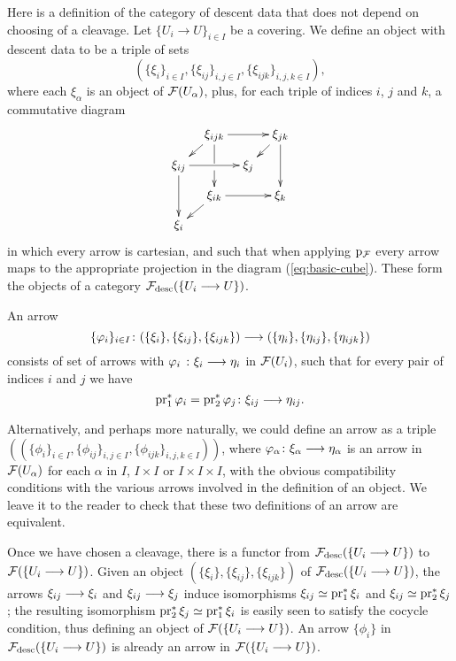 \begin{4   STACKS}
\begin{4.1 Descent of objects of fibcats}
Here is a definition of the category of descent data that does not depend on choosing of a cleavage. Let $\{U_i \to U\}_{i \in I}$ be a covering. We define an object with descent data to be a triple of sets
   \[
   (\{\xi_i\}_{i \in I}, \{\xi_{ij}\}_{i, j\in I},
   \{\xi_{ijk}\}_{i, j, k\in I}),
   \]
where each $\xi_\alpha$ is an object of $\mathcal{F}(U_{\alpha})$, plus, for each triple of indices $i$, $j$ and $k$, a commutative diagram
   \[
   \xymatrix@-15pt{
   &\xi_{ijk}\ar[rr]\ar'[d][dd] \ar[ld] &&\xi_{jk}\ar[ld]\ar[dd]\\
   \xi_{ij}\ar[dd]\ar[rr] && \xi_j\\
   &\xi_{ik} \ar[ld]\ar[rr] &&\xi_k\\
   \xi_i&&
   }
   \]
in which every arrow is cartesian, and such that when applying $\mathrm{p}_{\mathcal{F}}$ every arrow maps to the appropriate projection in the diagram (\ref{eq:basic-cube}). These form the objects of a category $\mathcal{F}_{\mathrm{desc}}(\{U_i \longrightarrow U\})$.

An arrow
   \[
   \{\phi_i\}_{i \in I} \colon (\{\xi_i\}, \{\xi_{ij}\},\{\xi_{ijk}\})
   \arr (\{\eta_i\}, \{\eta_{ij}\}, \{\eta_{ijk}\})
   \]
consists of set of arrows with $\phi_i\ \colon \xi_i \arr \eta_i $ in $\mathcal{F}(U_i)$, such that for every pair of indices $i$ and $j$ we have
   \[
   \pr_1^* \phi_i = \pr_2 ^* \phi_j \colon 
   \xi_{ij} \arr \eta_{ij}.
   \]

Alternatively, and perhaps more naturally, we could define an arrow as a triple $((\{\phi_i\}_{i \in I}, \{\phi_{ij}\}_{i, j\in I}, \{\phi_{ijk}\}_{i, j, k\in I}))$, where $\phi_\alpha \colon \xi_\alpha \arr \eta_\alpha$ is an arrow in $\mathcal{F}(U_{\alpha})$ for each $\alpha$ in $I$, $I\times I$ or $I \times I \times I$, with the obvious compatibility conditions with the various arrows involved in the definition of an object. We leave it to the reader to check that these two definitions of an arrow are equivalent.

Once we have chosen a cleavage, there is a functor from $\mathcal{F}_{\mathrm{desc}} (\{U_i \longrightarrow U\})$ to $\mathcal{F}(\{U_i \longrightarrow U\})$. Given an object $(\{\xi_i\}, \{\xi_{ij}\}, \{\xi_{ijk}\})$ of $\mathcal{F}_{\mathrm{desc}}(\{U_i \longrightarrow U\})$, the arrows $\xi_{ij} \arr \xi_i$ and $\xi_{ij} \arr\xi_j$ induce isomorphisms $\xi_{ij} \simeq \operatorname{pr}_1^* \xi_i$ and $\xi_{ij} \simeq \operatorname{pr}_2^* \xi_j$; the resulting isomorphism $\operatorname{pr}_2^* \xi_j \simeq \operatorname{pr}_1^* \xi_i$ is easily seen to satisfy the cocycle condition, thus defining an object of $\mathcal{F}(\{U_i \longrightarrow U\})$. An arrow $\{\phi_i\}$ in $\mathcal{F}_{\mathrm{desc}} (\{U_i \longrightarrow U\})$ is already an arrow in $\mathcal{F}(\{U_i \longrightarrow U\})$.


\end{4.1 Descent of objects of fibcats}
\end{4   STACKS}
